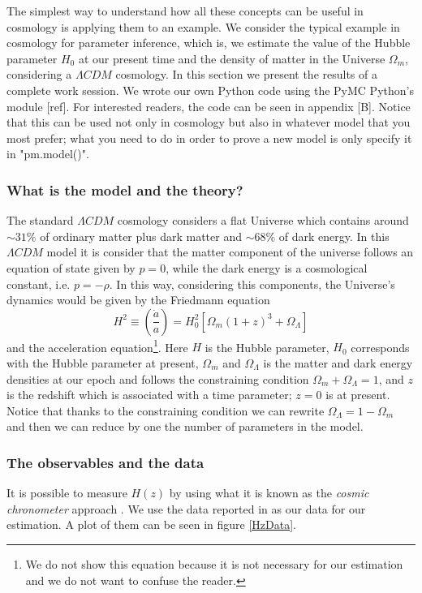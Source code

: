 \documentclass[onecolumn,           %
               showpacs,            %
               preprintnumbers,     %
               aps,                 %
               prl,          	    %
               letterpaper,             %
               superscriptaddress,      %
               nofootinbib,         %
               tightenlines,        %
               floats,floatfix      %
               ,usenatbib,
               ]{revtex4-1}
\begin{document}
The simplest way to understand how all these concepts can be useful in cosmology is applying them to an example. We consider the typical example in cosmology for parameter inference, which is, we estimate the value of the Hubble parameter $H_0$ at our present time and the density of matter in the Universe $\Omega_m$, considering a $\Lambda CDM$ cosmology. In this section we present the results of a complete work session. We wrote our own Python code using the PyMC Python's module [ref]. For interested readers, the code can be seen in appendix [B]. Notice that this can be used not only in cosmology but also in whatever model that you most prefer; what you need to do in order to prove a new model is only specify it in "pm.model()". 

\subsubsection{What is the model and the theory?}

The standard $\Lambda CDM$ cosmology considers a flat Universe which contains around $\sim 31\%$ of ordinary matter plus dark matter and $\sim 68\%$ of dark energy. In this $\Lambda CDM$ model it is consider that the matter component of the universe follows an equation of state given by $p=0$, while the dark energy is a cosmological constant, i.e. $p=-\rho$. In this way, considering this components, the Universe's dynamics would be given by the Friedmann equation
\begin{equation}
H^2\equiv\left(\frac{\dot a}{a}\right)=H_0^2[\Omega_m(1+z)^3+\Omega_{\Lambda}]
\end{equation}
and the acceleration equation\footnote{We do not show this equation because it is not necessary for our estimation and we do not want to confuse the reader.}. Here $H$ is the Hubble parameter, $H_0$ corresponds with the Hubble parameter at present, $\Omega_m$ and $\Omega_\Lambda$ is the matter and dark energy densities at our epoch and follows the constraining condition $\Omega_m+\Omega_\Lambda=1$, and $z$ is the redshift which is associated with a time parameter; $z=0$ is at present. Notice that thanks to the constraining condition we can rewrite $\Omega_\Lambda=1-\Omega_m$ and then we can reduce by one the number of parameters in the model. 
\subsubsection{The observables and the data}

It is possible to measure $H(z)$ by using what it is known as the \textit{cosmic chronometer} approach \cite{Hz}. We use the data reported in \cite{Hzdata} as our data for our estimation. A plot of them can be seen in figure \ref{HzData}.
\end{document}
